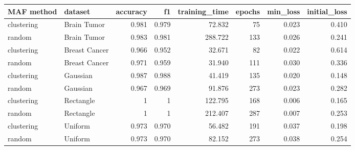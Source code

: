 \begin{tabular}{llrrrrrr}
\toprule
MAF method & dataset & accuracy & f1 & training_time & epochs & min_loss & initial_loss \\
\midrule
clustering & Brain Tumor & 0.981 & 0.979 & 72.832 & 75 & 0.023 & 0.410 \\
random & Brain Tumor & 0.983 & 0.981 & 288.722 & 133 & 0.026 & 0.241 \\
clustering & Breast Cancer & 0.966 & 0.952 & 32.671 & 82 & 0.022 & 0.614 \\
random & Breast Cancer & 0.971 & 0.959 & 31.940 & 111 & 0.030 & 0.336 \\
clustering & Gaussian & 0.987 & 0.988 & 41.419 & 135 & 0.020 & 0.148 \\
random & Gaussian & 0.967 & 0.969 & 91.876 & 273 & 0.023 & 0.282 \\
clustering & Rectangle & 1 & 1& 122.795 & 168 & 0.006 & 0.165 \\
random & Rectangle & 1 & 1 & 212.407 & 287 & 0.007 & 0.253 \\
clustering & Uniform & 0.973 & 0.970 & 56.482 & 191 & 0.037 & 0.198 \\
random & Uniform & 0.973 & 0.970 & 82.152 & 273 & 0.038 & 0.254 \\
\bottomrule
\end{tabular}
